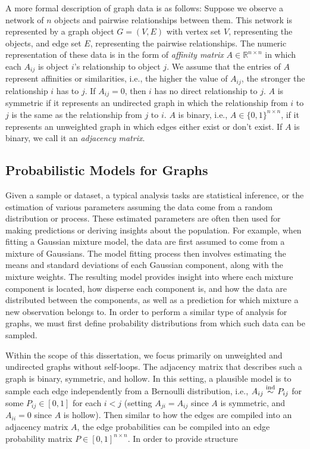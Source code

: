 \documentclass[
  11pt,
]{article}
\begin{document}
A more formal description of graph data is as follows: Suppose we
observe a network of \(n\) objects and pairwise relationships between
them. This network is represented by a graph object \(G = (V, E)\) with
vertex set \(V\), representing the objects, and edge set \(E\),
representing the pairwise relationships. The numeric representation of
these data is in the form of \emph{affinity matrix}
\(A \in \mathbb{R}^{n \times n}\) in which each \(A_{ij}\) is object
\(i\)'s relationship to object \(j\). We assume that the entries of
\(A\) represent affinities or similarities, i.e., the higher the value
of \(A_{ij}\), the stronger the relationship \(i\) has to \(j\). If
\(A_{ij} = 0\), then \(i\) has no direct relationship to \(j\). \(A\) is
symmetric if it represents an undirected graph in which the relationship
from \(i\) to \(j\) is the same as the relationship from \(j\) to \(i\).
\(A\) is binary, i.e., \(A \in \{0, 1\}^{n \times n}\), if it represents
an unweighted graph in which edges either exist or don't exist. If \(A\)
is binary, we call it an \emph{adjacency matrix}.

\hypertarget{probabilistic-models-for-graphs}{%
\subsection{Probabilistic Models for
Graphs}\label{probabilistic-models-for-graphs}}

Given a sample or dataset, a typical analysis tasks are statistical
inference, or the estimation of various parameters assuming the data
come from a random distribution or process. These estimated parameters
are often then used for making predictions or deriving insights about
the population. For example, when fitting a Gaussian mixture model, the
data are first assumed to come from a mixture of Gaussians. The model
fitting process then involves estimating the means and standard
deviations of each Gaussian component, along with the mixture weights.
The resulting model provides insight into where each mixture component
is located, how disperse each component is, and how the data are
distributed between the components, as well as a prediction for which
mixture a new observation belongs to. In order to perform a similar type
of analysis for graphs, we must first define probability distributions
from which such data can be sampled.

Within the scope of this dissertation, we focus primarily on unweighted
and undirected graphs without self-loops. The adjacency matrix that
describes such a graph is binary, symmetric, and hollow. In this
setting, a plausible model is to sample each edge independently from a
Bernoulli distribution, i.e., \(A_{ij} \stackrel{\mathrm{ind}}{\sim} P_{ij}\) for some
\(P_{ij} \in [0, 1]\) for each \(i < j\) (setting \(A_{ji} = A_{ij}\)
since \(A\) is symmetric, and \(A_{ii} = 0\) since \(A\) is hollow).
Then similar to how the edges are compiled into an adjacency matrix
\(A\), the edge probabilities can be compiled into an edge probability
matrix \(P \in [0, 1]^{n \times n}\). In order to provide structure
\end{document}
